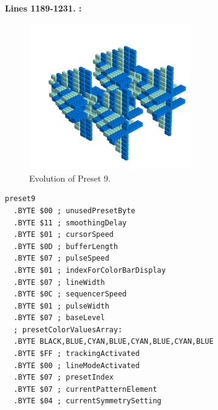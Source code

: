 \textbf{Lines 1189-1231. :} 
\clearpage
\begin{minipage}[b]{0.48\linewidth}
\begin{figure}[H]                                                          
  \centering                                                             
  \begin{adjustbox}{width=7cm,center}                                   
  \includegraphics[width=7cm]{src/presets/pattern9-45.png}%
  \end{adjustbox}                                                        
\caption{Evolution of Preset 9.}                                           
\end{figure}                                                               
\end{minipage}
\hspace{0.1cm}
\begin{minipage}[b]{0.48\linewidth}                                       
\begin{lstlisting}[basicstyle=\ttfamily\scriptsize,caption=Data structure for Preset 9.]
preset9
  .BYTE $00 ; unusedPresetByte
  .BYTE $11 ; smoothingDelay
  .BYTE $01 ; cursorSpeed
  .BYTE $0D ; bufferLength
  .BYTE $07 ; pulseSpeed
  .BYTE $01 ; indexForColorBarDisplay
  .BYTE $07 ; lineWidth
  .BYTE $0C ; sequencerSpeed
  .BYTE $01 ; pulseWidth
  .BYTE $07 ; baseLevel
  ; presetColorValuesArray: 
  .BYTE BLACK,BLUE,CYAN,BLUE,CYAN,BLUE,CYAN,BLUE
  .BYTE $FF ; trackingActivated
  .BYTE $00 ; lineModeActivated
  .BYTE $07 ; presetIndex
  .BYTE $07 ; currentPatternElement
  .BYTE $04 ; currentSymmetrySetting
\end{lstlisting}
\end{minipage}

